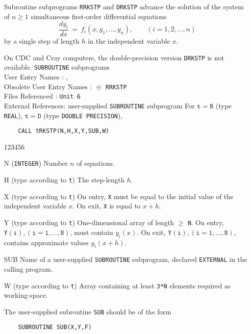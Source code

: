                           
                 
\Submitter{}                             
               
Subroutine subprograms {\tt RRKSTP}  and {\tt DRKSTP} advance the
solution of the system of $n \ge 1$ simultaneous first-order
differential equations
$$ \frac{dy_i}{dx} \ = \
f_i(x,y_1,\ldots,y_n), \qquad (i = 1,2,\ldots,n)$$
by a single step of length $h$ in the independent variable $x$.
\par
On CDC and Cray computers, the double-precision version {\tt DRKSTP}
is not available.
\Structure
{\tt SUBROUTINE} subprograms \\
User Entry   Names : , \\
Obsolete User Entry Names : \Rdef{RKSTP} $\equiv$ {\tt RRKSTP} \\
Files  Referenced : {\tt Unit 6} \\
External  References: user-supplied {\tt SUBROUTINE} subprogram
\Usage
For $\mathtt{t=R}$ (type {\tt REAL}), $\mathtt{t=D}$ (type
{\tt DOUBLE PRECISION}),
\begin{verbatim}
    CALL tRKSTP(N,H,X,Y,SUB,W)
\end{verbatim}
\begin{DLtt}{123456}
\item[N] ({\tt INTEGER}) Number $n$ of equations.
\item[H] (type according to {\tt t}) The  step-length $h$.
\item[X] (type according to {\tt t}) On entry, {\tt X} must be equal
to the initial value of the independent variable $x$. On exit,
{\tt X} is equal to $x+h$.
\item[Y] (type according to {\tt t})
One-dimensional array of length $\ge $ {\tt N}.
On entry, $\mathtt{Y(i),(i=1,\ldots,N)}$, must contain $y_i(x)$.
On exit, $\mathtt{Y(i),(i=1,\ldots,N)}$, contains approximate values
 $y_i(x+h)$.
\item[SUB] Name of a user-supplied {\tt SUBROUTINE} subprogram,
declared {\tt EXTERNAL} in the calling program.
\item[W] (type according to {\tt t}) Array containing at least
{\tt 3*N} elements required as working-space.
\end{DLtt}
The user-supplied subroutine {\tt SUB} should be of the form
\begin{verbatim}
    SUBROUTINE SUB(X,Y,F)
\end{verbatim}
